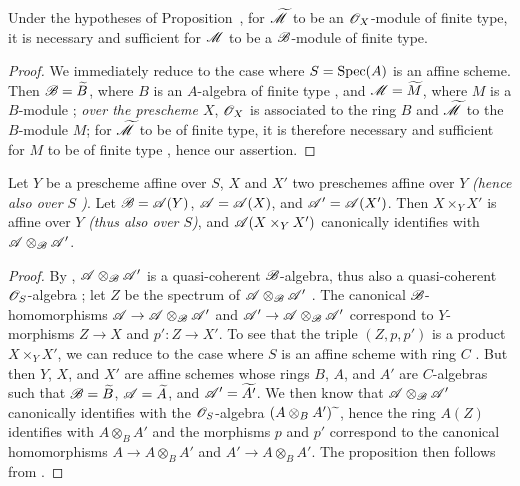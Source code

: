\begin{corollary}[1.4.5]
\label{II.1.4.5}
Under the hypotheses of Proposition~, for $\widetilde{\mathscr{M}}$ to be an $\mathscr{O}_X$-module of finite type, it is necessary and sufficient for $\mathscr{M}$ to be a $\mathscr{B}$-module of finite type.
\end{corollary}

\begin{proof}
We immediately reduce to the case where $S=\operatorname{Spec}(A)$ is an affine scheme.
Then $\mathscr{B}=\widetilde{B}$, where $B$ is an $A$-algebra of finite type , and $\mathscr{M}=\widetilde{M}$, where $M$ is a $B$-module ; \emph{over the prescheme $X$}, $\mathscr{O}_X$ is associated to the ring $B$ and $\widetilde{\mathscr{M}}$ to the $B$-module $M$; for $\widetilde{\mathscr{M}}$ to be of finite type, it is therefore necessary and sufficient for $M$ to be of finite type , hence our assertion.
\end{proof}

\begin{proposition}[1.4.6]
\label{II.1.4.6}
Let $Y$ be a prescheme affine over $S$, $X$ and $X'$ two preschemes affine over $Y$ \emph{(hence also over $S$ )}.
Let $\mathscr{B}=\mathscr{A}(Y)$, $\mathscr{A}=\mathscr{A}(X)$, and $\mathscr{A}'=\mathscr{A}(X')$.
Then $X\times_Y X'$ is affine over $Y$ \emph{(thus also over $S$)}, and $\mathscr{A}(X\times_Y X')$ canonically identifies with $\mathscr{A}\otimes_\mathscr{B}\mathscr{A}'$.
\end{proposition}

\begin{proof}
By , $\mathscr{A}\otimes_\mathscr{B}\mathscr{A}'$ is a quasi-coherent $\mathscr{B}$-algebra, thus also a quasi-coherent $\mathscr{O}_S$-algebra ; let $Z$ be the spectrum of $\mathscr{A}\otimes_\mathscr{B}\mathscr{A}'$ .
The canonical $\mathscr{B}$-homomorphisms $\sh{A}\to\sh{A}\otimes_\sh{B}\sh{A}'$ and $\sh{A}'\to\sh{A}\otimes_\sh{B}\sh{A}'$ correspond  to $Y$-morphisms $Z\to X$ and $p':Z\to X'$.
To see that the triple $(Z,p,p')$ is a product $X\times_Y X'$, we can reduce to the case where $S$ is an affine scheme with ring $C$ .
But then $Y$, $X$, and $X'$ are affine schemes  whose rings $B$, $A$, and $A'$ are $C$-algebras such that $\mathscr{B}=\widetilde{B}$, $\mathscr{A}=\widetilde{A}$, and $\mathscr{A}'=\widetilde{A'}$.
We then know  that $\mathscr{A}\otimes_\mathscr{B}\mathscr{A}'$ canonically identifies with the $\mathscr{O}_S$-algebra $(A\otimes_B A'){\,\widetilde{\,}\,}$, hence the ring $A(Z)$ identifies with $A\otimes_B A'$ and the morphisms $p$ and $p'$ correspond to the canonical homomorphisms $A\to A\otimes_B A'$ and $A'\to A\otimes_B A'$.
The proposition then follows from .
\end{proof}

